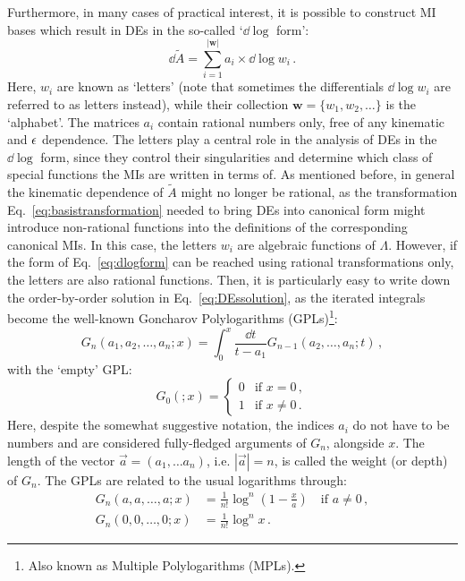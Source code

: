 \documentclass[main.tex]{subfiles}
\begin{document}
Furthermore, in many cases of practical interest, it is possible to construct MI bases which result in DEs in the so-called `$\dd \log$ form':
\begin{equation} \label{eq:dlogform}
    \dd\tilde{A} = \sum_{i=1}^{|\bm{w}|} a_i \times \dd \log w_i\,.
\end{equation}
Here, $w_i$ are known as `letters' (note that sometimes the differentials $\dd \log w_i$ are referred to as letters instead), while their collection $\bm{w} = \{w_1, w_2, \ldots\}$ is the `alphabet'. The matrices $a_i$ contain rational numbers only, free of any kinematic and $\epsilon$ dependence. The letters play a central role in the analysis of DEs in the $\dd \log$ form, since they control their singularities and determine which class of special functions the MIs are written in terms of. As mentioned before, in general the kinematic dependence of $\tilde{A}$ might no longer be rational, as the transformation Eq.~\ref{eq:basistransformation} needed to bring DEs into canonical form might introduce non-rational functions into the definitions of the corresponding canonical MIs. In this case, the letters $w_i$ are algebraic functions of $\Lambda$. However, if the form of Eq.~\ref{eq:dlogform} can be reached using rational transformations only, the letters are also rational functions. Then, it is particularly easy to write down the order-by-order solution in Eq.~\ref{eq:DEssolution}, as the iterated integrals become the well-known Goncharov Polylogarithms (GPLs)\footnote{Also known as Multiple Polylogarithms (MPLs).}\cite{2001math......3059G, 2011arXiv1105.2076G, Vollinga:2004sn}:
\begin{equation} \label{eq:GPLs}
    G_n(a_1, a_2, \ldots, a_n; x) = \int_0^x \frac{\dd t}{t-a_1} G_{n-1}(a_2, \ldots, a_n; t)\,,
\end{equation}
with the `empty' GPL:
\begin{equation}
    G_0(; x) = 
    \begin{cases}
        0 & \text{if } x = 0\,, \\
        1 & \text{if } x \neq 0\,. 
    \end{cases}
\end{equation}
Here, despite the somewhat suggestive notation, the indices $a_i$ do not have to be numbers and are considered fully-fledged arguments of $G_n$, alongside $x$. The length of the vector $\vec{a} = (a_1, \ldots a_n)$, i.e. $|\vec{a}|=n$, is called the weight (or depth) of $G_n$. The GPLs are related to the usual logarithms through:
\begin{subequations}
   \begin{align}
    G_n(a, a, \ldots, a; x) &= 
        \frac{1}{n!}\log^n\left(1-\frac{x}{a}\right) \quad \text{if } a \neq 0\,, \label{eq:GPLtolognonzero} \\ 
    G_n(0, 0, \ldots, 0; x) &= 
        \frac{1}{n!}\log^n x \,. \label{eq:GPLtologzero}
   \end{align} 
\end{subequations}
\end{document}
